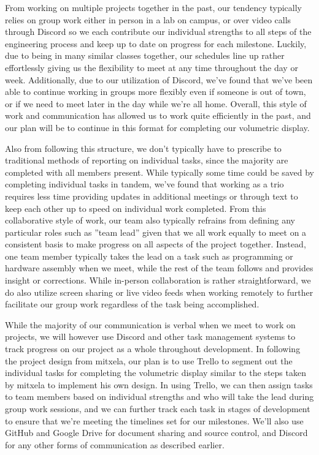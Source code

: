 \documentclass[11pt,journal]{IEEEtran}
\begin{document}
From working on multiple projects together in the past, our tendency typically relies on group work either in person in a lab on campus, or over video calls through Discord so we each contribute our individual strengths to all steps of the engineering process and keep up to date on progress for each milestone. Luckily, due to being in many similar classes together, our schedules line up rather effortlessly giving us the flexibility to meet at any time throughout the day or week. Additionally, due to our utilization of Discord, we’ve found that we’ve been able to continue working in groups more flexibly even if someone is out of town, or if we need to meet later in the day while we’re all home. Overall, this style of work and communication has allowed us to work quite efficiently in the past, and our plan will be to continue in this format for completing our volumetric display.

Also from following this structure, we don’t typically have to prescribe to traditional methods of reporting on individual tasks, since the majority are completed with all members present. While typically some time could be saved by completing individual tasks in tandem, we’ve found that working as a trio requires less time providing updates in additional meetings or through text to keep each other up to speed on individual work completed. From this collaborative style of work, our team also typically refrains from defining any particular roles such as ''team lead'' given that we all work equally to meet on a consistent basis to make progress on all aspects of the project together. Instead, one team member typically takes the lead on a task such as programming or hardware assembly when we meet, while the rest of the team follows and provides insight or corrections. While in-person collaboration is rather straightforward, we do also utilize screen sharing or live video feeds when working remotely to further facilitate our group work regardless of the task being accomplished.

While the majority of our communication is verbal when we meet to work on projects, we will however use Discord and other task management systems to track progress on our project as a whole throughout development. In following the project design from mitxela, our plan is to use Trello to segment out the individual tasks for completing the volumetric display similar to the steps taken by mitxela to implement his own design. In using Trello, we can then assign tasks to team members based on individual strengths and who will take the lead during group work sessions, and we can further track each task in stages of development to ensure that we’re meeting the timelines set for our milestones. We’ll also use GitHub and Google Drive for document sharing and source control, and Discord for any other forms of communication as described earlier.
\end{document}
